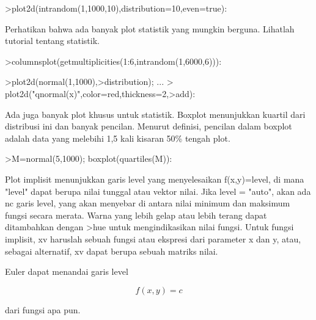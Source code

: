 \documentclass[a4paper,10pt]{article}
\begin{document}
\begin{eulernotebook}
\begin{eulercomment}
\begin{eulercomment}
\begin{eulerprompt}
>plot2d(intrandom(1,1000,10),distribution=10,even=true):
\end{eulerprompt}
\begin{eulercomment}
Perhatikan bahwa ada banyak plot statistik yang mungkin berguna.
Lihatlah tutorial tentang statistik.
\end{eulercomment}
\begin{eulerprompt}
>columnsplot(getmultiplicities(1:6,intrandom(1,6000,6))):
\end{eulerprompt}
\begin{eulerprompt}
>plot2d(normal(1,1000),>distribution); ...
>  plot2d("qnormal(x)",color=red,thickness=2,>add):
\end{eulerprompt}
\begin{eulercomment}
Ada juga banyak plot khusus untuk statistik. Boxplot menunjukkan
kuartil dari distribusi ini dan banyak pencilan. Menurut definisi,
pencilan dalam boxplot adalah data yang melebihi 1,5 kali kisaran 50\%
tengah plot.
\end{eulercomment}
\begin{eulerprompt}
>M=normal(5,1000); boxplot(quartiles(M)):
\end{eulerprompt}
\begin{eulercomment}
Plot implisit menunjukkan garis level yang menyelesaikan f(x,y)=level,
di mana "level" dapat berupa nilai tunggal atau vektor nilai. Jika
level = "auto", akan ada nc garis level, yang akan menyebar di antara
nilai minimum dan maksimum fungsi secara merata. Warna yang lebih
gelap atau lebih terang dapat ditambahkan dengan \textgreater{}hue untuk
mengindikasikan nilai fungsi. Untuk fungsi implisit, xv haruslah
sebuah fungsi atau ekspresi dari parameter x dan y, atau, sebagai
alternatif, xv dapat berupa sebuah matriks nilai. 

Euler dapat menandai garis level 

\end{eulercomment}
\begin{eulerformula}
\[
f (x, y) = c 
\]
\end{eulerformula}
\begin{eulercomment}
dari fungsi apa pun. 


\end{eulercomment}
\end{eulercomment}
\end{eulercomment}
\end{eulernotebook}
\end{document}
